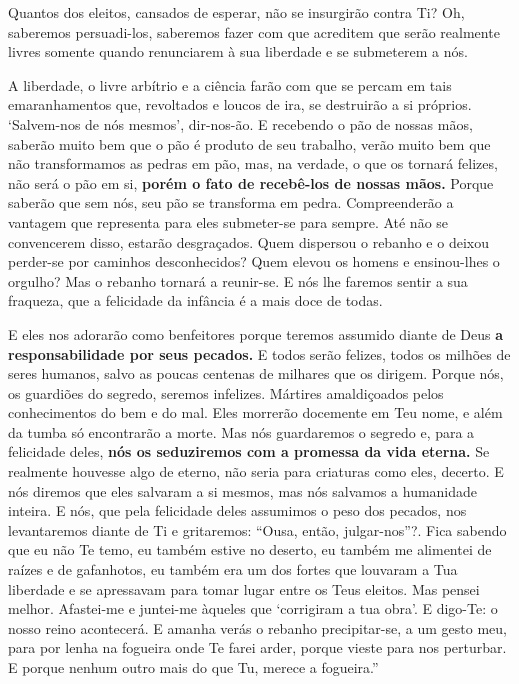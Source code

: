 Quantos dos eleitos, cansados de esperar, não se insurgirão contra Ti?
Oh, saberemos persuadi-los, saberemos fazer com que acreditem que serão
realmente livres somente quando renunciarem à sua liberdade e se
submeterem a nós.

A liberdade, o livre arbítrio e a ciência farão com que se percam em
tais emaranhamentos que, revoltados e loucos de ira, se destruirão a si
próprios. `Salvem-nos de nós mesmos', dir-nos-ão. E recebendo o pão de
nossas mãos, saberão muito bem que o pão é produto de seu trabalho,
verão muito bem que não transformamos as pedras em pão, mas, na verdade,
o que os tornará felizes, não será o pão em si, \textbf{porém o fato de
recebê-los de nossas mãos.} Porque saberão que sem nós, seu pão se
transforma em pedra. Compreenderão a vantagem que representa para eles
submeter-se para sempre. Até não se convencerem disso, estarão
desgraçados. Quem dispersou o rebanho e o deixou perder-se por caminhos
desconhecidos? Quem elevou os homens e ensinou-lhes o orgulho? Mas o
rebanho tornará a reunir-se. E nós lhe faremos sentir a sua fraqueza,
que a felicidade da infância é a mais doce de todas.

E eles nos adorarão como benfeitores porque teremos assumido diante de
Deus \textbf{a responsabilidade por seus pecados.} E todos serão
felizes, todos os milhões de seres humanos, salvo as poucas centenas de
milhares que os dirigem. Porque nós, os guardiões do segredo, seremos
infelizes. Mártires amaldiçoados pelos conhecimentos do bem e do mal.
Eles morrerão docemente em Teu nome, e além da tumba só encontrarão a
morte. Mas nós guardaremos o segredo e, para a felicidade deles,
\textbf{nós os seduziremos com a promessa da vida eterna.} Se realmente
houvesse algo de eterno, não seria para criaturas como eles, decerto. E
nós diremos que eles salvaram a si mesmos, mas nós salvamos a humanidade
inteira. E nós, que pela felicidade deles assumimos o peso dos pecados,
nos levantaremos diante de Ti e gritaremos: ``Ousa, então,
julgar-nos''?. Fica sabendo que eu não Te temo, eu também estive no
deserto, eu também me alimentei de raízes e de gafanhotos, eu também era
um dos fortes que louvaram a Tua liberdade e se apressavam para tomar
lugar entre os Teus eleitos. Mas pensei melhor. Afastei-me e juntei-me
àqueles que `corrigiram a tua obra'. E digo-Te: o nosso reino
acontecerá. E amanha verás o rebanho precipitar-se, a um gesto meu, para
por lenha na fogueira onde Te farei arder, porque vieste para nos
perturbar. E porque nenhum outro mais do que Tu, merece a fogueira.''

